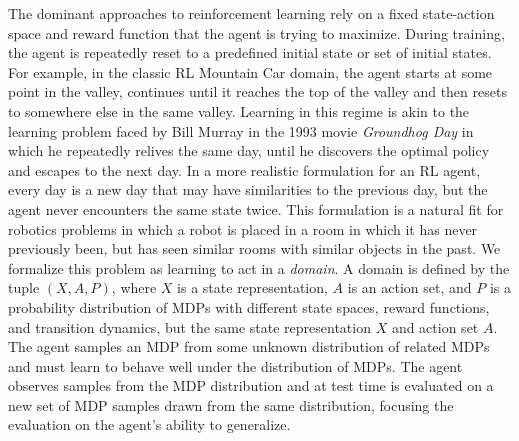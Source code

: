 The dominant approaches to reinforcement learning rely on a fixed
state-action space and reward function that the agent is trying to
maximize.  During training, the agent is repeatedly reset to a
predefined initial state or set of initial states.  For example, in
the classic RL Mountain Car domain, the agent starts at some point in
the valley, continues until it reaches the top of the valley and then
resets to somewhere else in the same valley. Learning in this regime
is akin to the learning problem faced by Bill Murray in the 1993 movie
{\em Groundhog Day} in which he repeatedly relives the same day, until
he discovers the optimal policy and escapes to the next day.  In a
more realistic formulation for an RL agent, every day is a new day
that may have similarities to the previous day, but the agent never
encounters the same state twice.  This formulation is a natural fit
for robotics problems in which a robot is placed in a room in which it
has never previously been, but has seen similar rooms with similar
objects in the past.  We formalize this problem as learning to act in
a {\em domain}. A domain is defined by the tuple $(X, A, P)$, where
$X$ is a state representation, $A$ is an action set, and $P$ is a
probability distribution of MDPs with different state spaces, reward
functions, and transition dynamics, but the same state representation
$X$ and action set $A$. The agent samples an MDP from some unknown
distribution of related MDPs and must learn to behave well under the
distribution of MDPs. The agent observes samples from the MDP
distribution and at test time is evaluated on a new set of MDP samples
drawn from the same distribution, focusing the evaluation on the
agent's ability to generalize.

